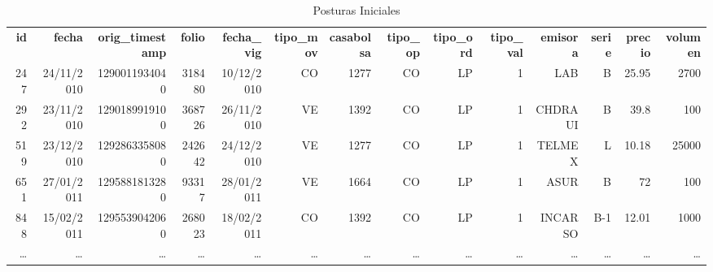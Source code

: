 \documentclass[11pt]{article}
\numberwithin{equation}{section} %
\begin{document}
\begin{landscape}

\begin{table}[htbp]\scriptsize
\centering
\caption{Posturas Iniciales}
\setlength\tabcolsep{1.5pt}
\begin{tabular}{rrrrrrrrrrrrrr}
\textbf{ id}    & \textbf{fecha} & \textbf{orig\_timestamp} & \textbf{folio} & \textbf{fecha\_vig} & \textbf{tipo\_mov} & \textbf{casabolsa} & \textbf{tipo\_op} & \textbf{tipo\_ord} & \textbf{tipo\_val} & \textbf{emisora} & \textbf{serie} & \textbf{precio} & \textbf{volumen} \\
247 & 24/11/2010 & 1290011934040 & 318480 & 10/12/2010 & CO    & 1277  & CO    & LP    & 1     & LAB   & B     & 25.95 & 2700 \\
292 & 23/11/2010 & 1290189919100 & 368726 & 26/11/2010 & VE    & 1392  & CO    & LP    & 1     & CHDRAUI & B     & 39.8  & 100 \\
519 & 23/12/2010 & 1292863358080 & 242642 & 24/12/2010 & VE    & 1277  & CO    & LP    & 1     & TELMEX & L     & 10.18 & 25000 \\
651 & 27/01/2011 & 1295881813280 & 93317 & 28/01/2011 & VE    & 1664  & CO    & LP    & 1     & ASUR  & B     & 72    & 100 \\
848 & 15/02/2011 & 1295539042060 & 268023 & 18/02/2011 & CO    & 1392  & CO    & LP    & 1     & INCARSO & B-1   & 12.01 & 1000 \\
\ldots & \ldots & \ldots & \ldots & \ldots & \ldots & \ldots & \ldots & \ldots & \ldots & \ldots & \ldots & \ldots & \ldots \\
\end{tabular}%
\label{tab:posinicialesl}%
\end{table}%


\end{landscape}
\end{document}
